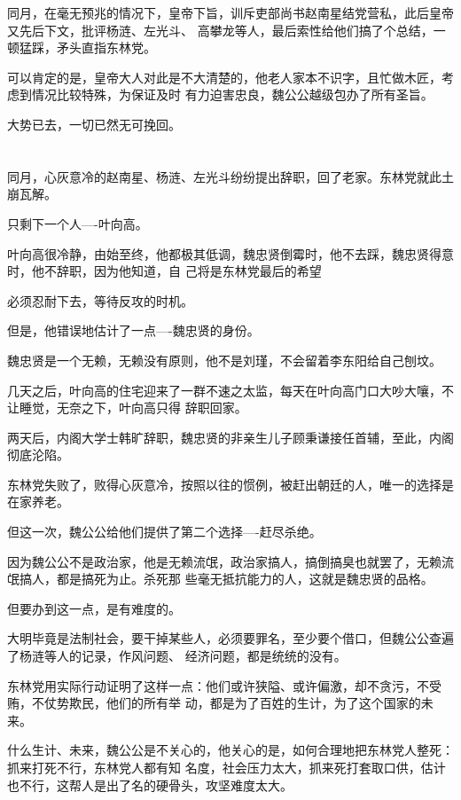 \documentclass[11pt,a4paper,onecolumn]{article}
\begin{document}
同月，在毫无预兆的情况下，皇帝下旨，训斥吏部尚书赵南星结党营私，此后皇帝又先后下文，批评杨涟、左光斗、
高攀龙等人，最后索性给他们搞了个总结，一顿猛踩，矛头直指东林党。

可以肯定的是，皇帝大人对此是不大清楚的，他老人家本不识字，且忙做木匠，考虑到情况比较特殊，为保证及时
有力迫害忠良，魏公公越级包办了所有圣旨。

大势已去，一切已然无可挽回。

\section[\thesection]{}

同月，心灰意冷的赵南星、杨涟、左光斗纷纷提出辞职，回了老家。东林党就此土崩瓦解。

只剩下一个人----叶向高。

叶向高很冷静，由始至终，他都极其低调，魏忠贤倒霉时，他不去踩，魏忠贤得意时，他不辞职，因为他知道，自
己将是东林党最后的希望

必须忍耐下去，等待反攻的时机。

但是，他错误地估计了一点----魏忠贤的身份。

魏忠贤是一个无赖，无赖没有原则，他不是刘瑾，不会留着李东阳给自己刨坟。

几天之后，叶向高的住宅迎来了一群不速之太监，每天在叶向高门口大吵大嚷，不让睡觉，无奈之下，叶向高只得
辞职回家。

两天后，内阁大学士韩旷辞职，魏忠贤的非亲生儿子顾秉谦接任首辅，至此，内阁彻底沦陷。

东林党失败了，败得心灰意冷，按照以往的惯例，被赶出朝廷的人，唯一的选择是在家养老。

但这一次，魏公公给他们提供了第二个选择----赶尽杀绝。

因为魏公公不是政治家，他是无赖流氓，政治家搞人，搞倒搞臭也就罢了，无赖流氓搞人，都是搞死为止。杀死那
些毫无抵抗能力的人，这就是魏忠贤的品格。

但要办到这一点，是有难度的。

大明毕竟是法制社会，要干掉某些人，必须要罪名，至少要个借口，但魏公公查遍了杨涟等人的记录，作风问题、
经济问题，都是统统的没有。

东林党用实际行动证明了这样一点：他们或许狭隘、或许偏激，却不贪污，不受贿，不仗势欺民，他们的所有举
动，都是为了百姓的生计，为了这个国家的未来。

什么生计、未来，魏公公是不关心的，他关心的是，如何合理地把东林党人整死：抓来打死不行，东林党人都有知
名度，社会压力太大，抓来死打套取口供，估计也不行，这帮人是出了名的硬骨头，攻坚难度太大。
\end{document}
